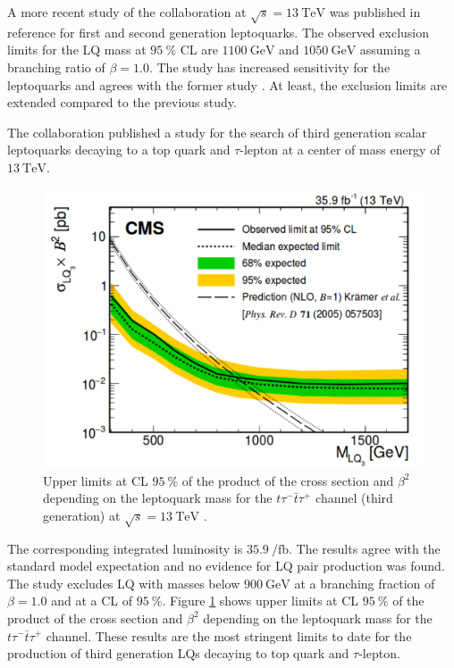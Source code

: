 A more recent study of the {\ATLAS} collaboration at $\sqrt{s}=\SI{13}{\tera\electronvolt}$ was published in reference \cite{currentStatus:13TeVATLAS} for first and second generation leptoquarks. The observed exclusion limits for the LQ mass at $\SI{95}{\percent}$ CL are $\SI{1100}{\giga\electronvolt}$ and $\SI{1050}{\giga\electronvolt}$ assuming a branching ratio of $\beta=1.0$. The study has increased sensitivity for the leptoquarks and agrees with the former study \cite{currentStatus:8TeVATLAS}. At least, the exclusion limits are extended \cite{currentStatus:13TeVATLAS} compared to the previous study.\par
The {\CMS} collaboration published a study for the search of third generation scalar leptoquarks decaying to a top quark and $\tau$-lepton at a center of mass energy of $\SI{13}{\tera\electronvolt}$.
%
\begin{figure}[htbp]                                 
 \begin{center}                                       
  \includegraphics[width=0.6\linewidth]{figures/exclusionLQ.pdf} 
   \caption[Upper limits of the product of the cross section and $\beta^2$ depending on the leptoquark mass for the $t\tau^-\bar{t}\tau^+$ channel.]{Upper limits at CL $\SI{95}{\percent}$ of the product of the cross section and $\beta^2$ depending on the leptoquark mass for the $t\tau^-\bar{t}\tau^+$ channel (third generation) at $\sqrt{s}=\SI{13}{\tera\electronvolt}$ \cite{currentStatus:13TeVATLAS}.}
  \label{exclusionLQ}                                     
 \end{center}
\end{figure}
%
The corresponding integrated luminosity is $\SI{35.9}{\per\femto\barn}$. The results agree with the standard model expectation and no evidence for LQ pair production was found. The study excludes LQ with masses below $\SI{900}{\giga\electronvolt}$ at a branching fraction of $\beta=1.0$ and at a CL of $\SI{95}{\percent}$. Figure \ref{exclusionLQ} shows upper limits at CL $\SI{95}{\percent}$ of the product of the cross section and $\beta^2$ depending on the leptoquark mass for the $t\tau^-\bar{t}\tau^+$ channel. These results are the most stringent limits to date for the production of third generation LQs decaying to top quark and $\tau$-lepton. \cite{currentStatus:13TeVCMS}\par
